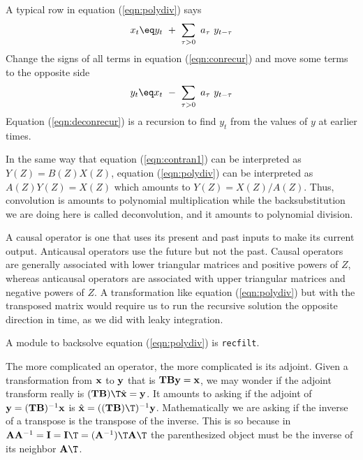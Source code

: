 \par
A typical row in equation (\ref{eqn:polydiv}) says
\begin{equation}
x_t \eq y_t \ +\ \sum_{\tau > 0} \ a_\tau\ y_{t-\tau}
\label{eqn:conrecur}
\end{equation}
Change the signs of all terms in equation
(\ref{eqn:conrecur})
and
move some terms to the opposite side
\begin{equation}
y_t \eq x_t \ -\ \sum_{\tau > 0} \ a_\tau\ y_{t-\tau}
\label{eqn:deconrecur}
\end{equation}
Equation (\ref{eqn:deconrecur}) is a recursion
to find $y_t$ from the values of $y$ at earlier times.

\par
In the same way that
equation (\ref{eqn:contran1})
can be interpreted as $Y(Z)=B(Z)X(Z)$,
equation (\ref{eqn:polydiv})
can be interpreted as $A(Z) Y(Z) = X(Z)$
which amounts to
$Y(Z) = X(Z)/A(Z)$.
Thus, convolution is amounts to polynomial multiplication
while the backsubstitution we are doing here
is called deconvolution, and it amounts to polynomial division.




\par
A causal operator is one that uses its present and past inputs
to make its current output.
Anticausal operators use the future but not the past.
Causal operators are generally associated with lower triangular matrices
and positive powers of $Z$, whereas
anticausal operators are associated with upper triangular matrices
and negative powers of $Z$.
A transformation like equation
(\ref{eqn:polydiv})
but with the transposed matrix would require us
to run the recursive solution the opposite direction in time,
as we did with leaky integration.


\par
A module to backsolve equation (\ref{eqn:polydiv}) is \texttt{recfilt}.

\par
The more complicated an operator, the more complicated is its adjoint.
Given a transformation from $\bold x$ to $\bold y$ that is
$\bold T\bold B \bold y = \bold x$,
we may wonder if the adjoint transform really is
$(\bold T\bold B)\T \hat{\bold x}= \bold y$.
It amounts to asking if the adjoint of
$\bold y = (\bold T\bold B)^{-1}\bold x$ is
$\hat{\bold x} = ((\bold T\bold B)\T)^{-1}\bold y$.
Mathematically we are asking if
the inverse of a transpose is the transpose of the inverse.
This is so because in
$\bold A\bold A^{-1} = \bold I = \bold I\T = (\bold A^{-1})\T\bold A\T$
the parenthesized object must be the inverse of its neighbor $\bold A\T$.



